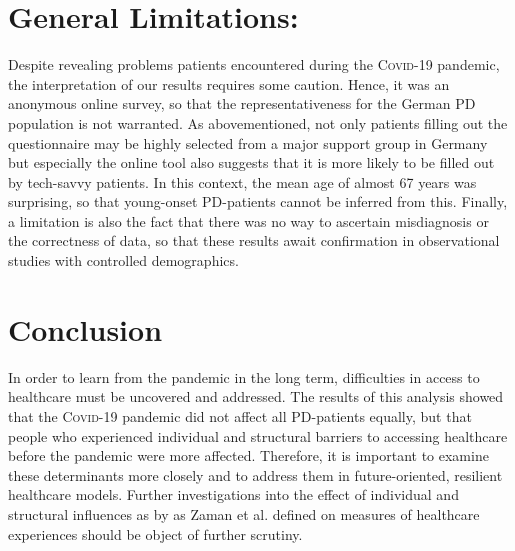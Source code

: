 \documentclass[a4paper,oneside,11pt,english]{scrartcl}
\begin{document}
\section*{General Limitations:}
Despite revealing problems patients encountered during the \textsc{Covid}-19 pandemic, the interpretation of our results requires some caution. Hence, it was an anonymous online survey, so that the representativeness for the German \textsc{PD} population is not warranted. As abovementioned, not only patients filling out the questionnaire may be highly selected from a major support group in Germany but especially the online tool also suggests that it is more likely to be filled out by tech-savvy patients. In this context, the mean age of almost 67 years was surprising, so that young-onset \textsc{\textsc{PD}}-patients cannot be inferred from this. Finally, a limitation is also the fact that there was no way to ascertain misdiagnosis or the correctness of data, so that these results await confirmation in observational studies with controlled demographics.

\section*{Conclusion}
In order to learn from the pandemic in the long term, difficulties in access to healthcare must be uncovered and addressed. The results of this analysis showed that the \textsc{Covid}-19 pandemic did not affect all \textsc{\textsc{PD}}-patients equally, but that people who experienced individual and structural barriers to accessing healthcare before the pandemic were more affected. Therefore, it is important to examine these determinants more closely and to address them in future-oriented, resilient healthcare models. Further investigations into the effect of individual and structural influences as by as Zaman et al. defined on measures of healthcare experiences should be object of further scrutiny. 

% 
\printbibliography %

\newpage
\end{document}
